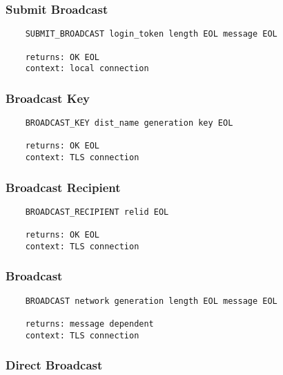 \documentclass[letterpaper,11pt,oneside]{article}
\begin{document}
\subsubsection{Submit Broadcast}

\vspace{10pt}
\begin{verbatim}
    SUBMIT_BROADCAST login_token length EOL message EOL

    returns: OK EOL
    context: local connection
\end{verbatim}
\vspace{10pt}

\subsubsection{Broadcast Key}

\vspace{10pt}
\begin{verbatim}
    BROADCAST_KEY dist_name generation key EOL

    returns: OK EOL
    context: TLS connection
\end{verbatim}
\vspace{10pt}

\subsubsection{Broadcast Recipient}

\vspace{10pt}
\begin{verbatim}
    BROADCAST_RECIPIENT relid EOL

    returns: OK EOL
    context: TLS connection
\end{verbatim}
\vspace{10pt}

\subsubsection{Broadcast}

\vspace{10pt}
\begin{verbatim}
    BROADCAST network generation length EOL message EOL

    returns: message dependent
    context: TLS connection
\end{verbatim}
\vspace{10pt}

\subsubsection{Direct Broadcast}
\end{document}
